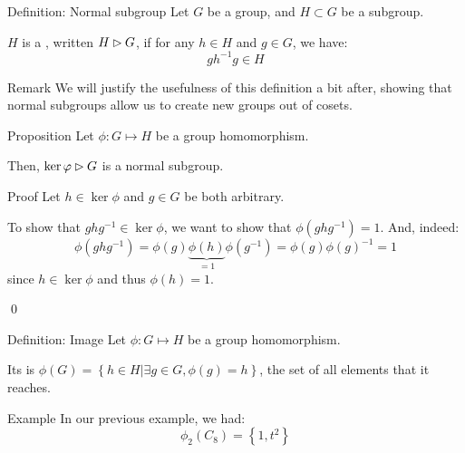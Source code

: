 \documentclass[a4paper]{article}
\begin{document}
\begin{parag}{Definition: Normal subgroup}
    Let $G$ be a group, and $H \subset G$ be a subgroup.

    $H$ is a , written $H \rhd G$, if for any $h \in H$ and $g \in G$, we have:
    \[g h^{-1} g \in H\]

    \begin{subparag}{Remark}
        We will justify the usefulness of this definition a bit after, showing that normal subgroups allow us to create new groups out of cosets.
    \end{subparag}
\end{parag}

\begin{parag}{Proposition}
    Let $\phi: G \mapsto H$ be a group homomorphism.

    Then, $\ker \varphi \rhd G$ is a normal subgroup.

    \begin{subparag}{Proof}
        Let $h \in \ker \phi$ and $g \in G$ be both arbitrary.

        To show that $g h g^{-1} \in \ker \phi$, we want to show that $\phi\left(g h g^{-1}\right) = 1$. And, indeed:
        \[\phi\left(g h g^{-1}\right) = \phi\left(g\right)\underbrace{\phi\left(h\right)}_{= 1}\phi\left(g^{-1}\right) = \phi\left(g\right)\phi\left(g\right)^{-1} = 1\]
        since $h \in \ker \phi$ and thus $\phi\left(h\right) = 1$.

        \qed
    \end{subparag}
\end{parag}

\begin{parag}{Definition: Image}
    Let $\phi: G \mapsto H$ be a group homomorphism.

    Its  is $\phi\left(G\right) = \left\{h \in H | \exists g \in G, \phi\left(g\right) = h\right\}$, the set of all elements that it reaches.

    \begin{subparag}{Example}
        In our previous example, we had: 
        \[\phi_2\left(C_8\right) = \left\{1, t^2\right\}\]
        
    \end{subparag}
    
\end{parag}
\end{document}
